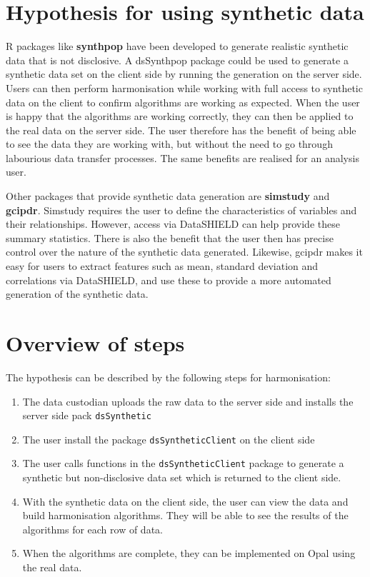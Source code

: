\documentclass[
]{book}
\providecommand{\tightlist}{%
  \setlength{\itemsep}{0pt}\setlength{\parskip}{0pt}}
\begin{document}
\hypertarget{hypothesis-for-using-synthetic-data}{%
\section{Hypothesis for using synthetic data}\label{hypothesis-for-using-synthetic-data}}

R packages like \textbf{synthpop} \citep{synthpop} have been developed to generate realistic synthetic data that is not disclosive. A dsSynthpop package could be used to generate a synthetic data set on the client side by running the generation on the server side. Users can then perform harmonisation while working with full access to synthetic data on the client to confirm algorithms are working as expected. When the user is happy that the algorithms are working correctly, they can then be applied to the real data on the server side. The user therefore has the benefit of being able to see the data they are working with, but without the need to go through labourious data transfer processes. The same benefits are realised for an analysis user.

Other packages that provide synthetic data generation are \textbf{simstudy} and \textbf{gcipdr}. Simstudy requires the user to define the characteristics of variables and their relationships. However, access via DataSHIELD can help provide these summary statistics. There is also the benefit that the user then has precise control over the nature of the synthetic data generated. Likewise, gcipdr makes it easy for users to extract features such as mean, standard deviation and correlations via DataSHIELD, and use these to provide a more automated generation of the synthetic data.

\hypertarget{overview-of-steps}{%
\section{Overview of steps}\label{overview-of-steps}}

The hypothesis can be described by the following steps for harmonisation:

\begin{enumerate}
\def\labelenumi{\arabic{enumi}.}
\tightlist
\item
  The data custodian uploads the raw data to the server side and installs the server side pack \texttt{dsSynthetic}
\item
  The user install the package \texttt{dsSyntheticClient} on the client side
\item
  The user calls functions in the \texttt{dsSyntheticClient} package to generate a synthetic but non-disclosive data set which is returned to the client side.
\item
  With the synthetic data on the client side, the user can view the data and build harmonisation algorithms. They will be able to see the results of the algorithms for each row of data.
\item
  When the algorithms are complete, they can be implemented on Opal using the real data.
\end{enumerate}
\end{document}
